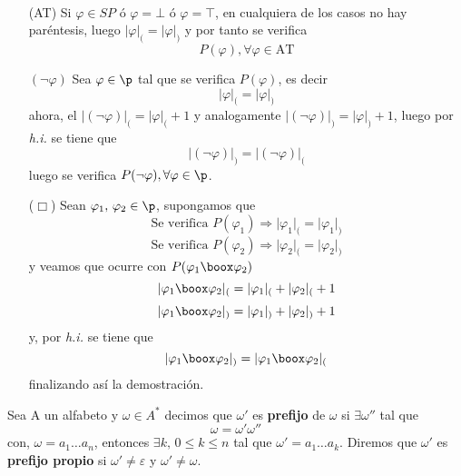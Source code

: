 \paragraph{}
\begin{itemize}
	\item[(AT)] Si $\varphi \in SP$ ó $\varphi=\bot$ ó $\varphi=\top$, en cualquiera de los casos no hay paréntesis, luego $\vert \varphi \vert_{(}=\vert \varphi \vert_{)}$ y por tanto se verifica
	\[ P(\varphi), \forall \varphi \in \mbox{AT} \]
	\item[$(\lnot \varphi)$] Sea $\varphi \in \p$ tal que se verifica $P(\varphi)$, es decir 
	\[ \vert \varphi \vert_{(}=\vert \varphi \vert_{)} \]
	ahora, el $\vert (\lnot \varphi) \vert_{(}= \vert \varphi \vert_{(} +1$ y analogamente $\vert (\lnot \varphi) \vert_{)}= \vert \varphi \vert_{)} +1$, luego por \textit{h.i.} se tiene que 
	\[ \vert (\lnot \varphi) \vert_{)}=\vert (\lnot \varphi) \vert_{(}  \]  
	luego se verifica $P(\lnot \varphi), \forall \varphi \in \p$.
	\item[($\Box$)] Sean $\varphi_1, \, \varphi_2 \in \p$, supongamos que
	\[ \mbox{Se verifica } P(\varphi_1) \Rightarrow \vert \varphi_1 \vert_{(}=\vert \varphi_1 \vert_{)}  \]
	\[ \mbox{Se verifica } P(\varphi_2) \Rightarrow \vert \varphi_2 \vert_{(}=\vert \varphi_2 \vert_{)}  \]  
	y veamos que ocurre con $P(\varphi_1 \boox \varphi_2)$ 
	\[ \vert \varphi_1 \boox \varphi_2 \vert_{(}= \vert \varphi_1 \vert_{(} + \vert \varphi_2 \vert_{(} +1  \]
	\[ \vert \varphi_1 \boox \varphi_2 \vert_{)}= \vert \varphi_1 \vert_{)} + \vert \varphi_2 \vert_{)} +1  \]
	y, por \textit{h.i.} se tiene que  
	\[ \vert \varphi_1 \boox \varphi_2 \vert_{)}= \vert \varphi_1 \boox \varphi_2 \vert_{(} \]
	finalizando así la demostración.
\end{itemize}

\begin{definition} Sea A un alfabeto y $\omega \in A^*$ decimos que $\omega'$ es \textbf{prefijo} de $\omega$ si $\exists \omega''$ tal que 
\[ \omega=\omega' \omega'' \]
con, $\omega=a_1 \ldots a_n$, entonces $\exists k, \, 0\leq k \leq n$ tal que $\omega'=a_1 \ldots a_k$. Diremos que $\omega'$ es \textbf{prefijo propio} si $\omega' \neq \varepsilon$ y $\omega' \neq \omega$. 
\end{definition}

